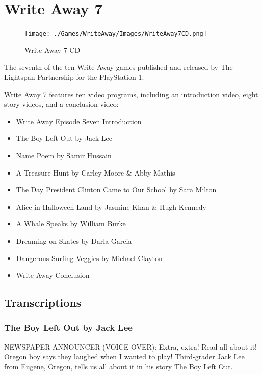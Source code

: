 \chapter{Write Away 7}

\begin{figure}[H]
    \centering
    \texttt{[image: ./Games/WriteAway/Images/WriteAway7CD.png]}
    \caption{Write Away 7 CD}
\end{figure}

The seventh of the ten Write Away games published and released by The Lightspan Partnership for the PlayStation 1.

Write Away 7 features ten video programs, including an introduction video, eight story videos, and a conclusion video:

\begin{itemize}
    \item Write Away Episode Seven Introduction
    \item The Boy Left Out by Jack Lee
    \item Name Poem by Samir Hussain
    \item A Treasure Hunt by Carley Moore \& Abby Mathis
    \item The Day President Clinton Came to Our School by Sara Milton
    \item Alice in Halloween Land by Jasmine Khan \& Hugh Kennedy
    \item A Whale Speaks by William Burke
    \item Dreaming on Skates by Darla Garcia
    \item Dangerous Surfing Veggies by Michael Clayton
    \item Write Away Conclusion
\end{itemize}

\clearpage
\newpage

\section{Transcriptions}

\subsection{The Boy Left Out by Jack Lee}

NEWSPAPER ANNOUNCER (VOICE OVER):
Extra, extra!
Read all about it!
Oregon boy says they laughed when I wanted to play!
Third-grader Jack Lee from Eugene, Oregon, tells us all about it in his story The Boy Left Out.

